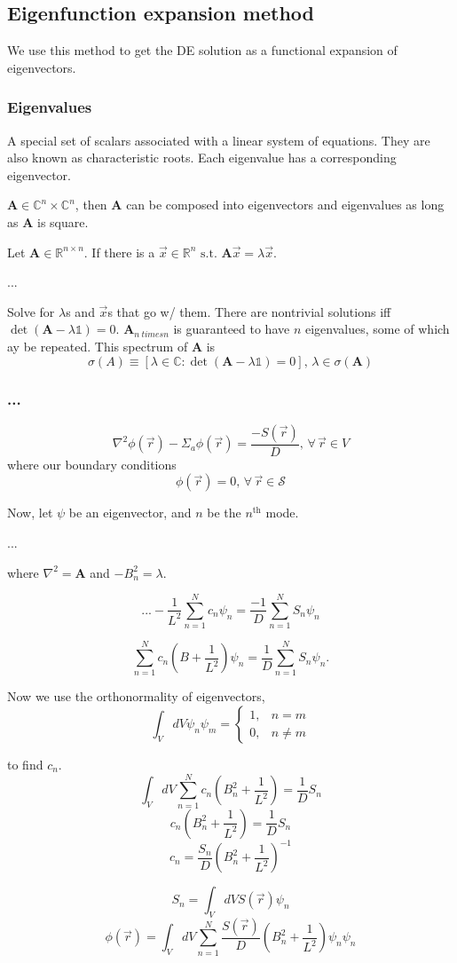 \documentclass{report}
\newcommand{\hh}[1]{\subsection*{#1}}
\newcommand{\hhh}[1]{\subsubsection*{#1}}
\newcommand{\Xs}{\Sigma}
\newcommand{\pos}{\vec{r}}
\begin{document}
\hh{Eigenfunction expansion method}
We use this method to get the DE solution as a functional expansion of eigenvectors.

\hhh{Eigenvalues}
A special set of scalars associated with a linear system of equations. They are also known as characteristic roots. Each eigenvalue has a corresponding eigenvector. 

$\mathbf{A} \in \mathbb{C}^n \times \mathbb{C}^n$, then $\mathbf{A}$ can be composed into eigenvectors and eigenvalues as long as $\mathbf{A}$ is square.

Let $\mathbf{A} \in \mathbb{R}^{n \times n}.$ If there is a $\vec{x} \in \mathbb{R}^n \text{ s.t. } \mathbf{A}\vec{x} = \lambda\vec{x}$.

...

Solve for $\lambda$s and $\vec{x}$s that go w/ them. There are nontrivial solutions iff $\det(\mathbf{A} - \lambda\mathbb{1}) = 0$. $\mathbf{A}_{n\ times n}$ is guaranteed to have $n$ eigenvalues, some of which ay be repeated. This spectrum of $\mathbf{A}$ is 
$$ \sigma(A) \equiv \left[ \lambda \in \mathbb{C} : \det(\mathbf{A}-\lambda\mathbb{1}) = 0 \right], \, \lambda \in \sigma(\mathbf{A}) $$

\hhh{...}
$$ \nabla^2 \phi(\pos) - \Xs_a \phi(\pos) = \frac{-S(\pos)}{D}, \, \forall \, \pos \in V $$
where our boundary conditions 
$$ \phi(\pos) = 0, \, \forall \, \pos \in \mathcal{S} $$

Now, let $\psi$ be an eigenvector, and $n$ be the $n^{\text{th}}$ mode.


...

where $\nabla^2 = \mathbf{A}$ and $-B_n^2 = \lambda$.

$$ ... - \frac{1}{L^2}\sum_{n=1}^N c_n \psi_n = \frac{-1}{D}\sum_{n=1}^{N} S_n \psi_n $$


$$ \sum_{n=1}^N c_n \left(B + \frac{1}{L^2}\right) \psi_n = \frac{1}{D}\sum_{n=1}^N S_n \psi_n .$$

Now we use the orthonormality of eigenvectors,
$$ \int_V dV \psi_n \psi_m =	\begin{cases}	1, & n=m \\
												0, & n \neq m
								\end{cases}$$
											
to find $c_n$.
$$ \int_V dV \sum_{n=1}^N c_n \left(B_n^2 + \frac{1}{L^2} \right) = \frac{1}{D} S_n $$
$$ c_n \left(B_n^2 + \frac{1}{L^2}\right) = \frac{1}{D} S_n $$
$$ c_n = \frac{S_n}{D}\left(B_n^2 + \frac{1}{L^2}\right)^{-1} $$

$$ S_n = \int_V dV S(\pos) \psi_n $$
$$ \phi(\pos) = \int_V dV \sum_{n=1}^N \frac{S(\pos)}{D}\left(B_n^2 + \frac{1}{L^2}\right)\psi_n \psi_n $$
\end{document}
